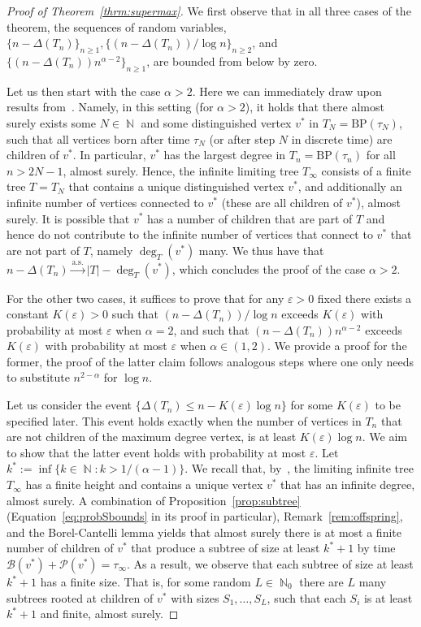 \documentclass[11pt]{article}
\numberwithin{equation}{section}
\DeclareMathOperator{\N}{\mathbb{N}} %
\newcommand{\eps}{\varepsilon} %
\newcommand{\bp}{\mathrm{BP}}
\def\cB{{\mathcal B}}
\def\cP{{\mathcal P}}
\theoremstyle{definition}
\begin{document}
\begin{proof}[Proof of Theorem~\ref{thrm:supermax}]
    We first observe that in all three cases of the theorem, the sequences of random variables, $\{n-\Delta(T_n)\}_{n\geq 1}, \{(n-\Delta(T_n))/\log n\}_{n\geq 2}$, and $\{(n-\Delta(T_n))n^{\alpha-2}\}_{n\geq 1}$, are bounded from below by zero.
    
    Let us then start with the case $\alpha>2$. Here we can immediately draw upon results from~\cite[Theorem $1.2$]{oliveira2005connectivity}. Namely, in this setting (for $\alpha>2$), it holds that there almost surely exists some $N\in\N$ and some distinguished vertex $v^*$ in $T_N=\bp(\tau_N)$, such that all vertices born after time $\tau_N$ (or after step $N$ in discrete time) are children of $v^*$. In particular, $v^*$ has the largest degree in $T_n=\bp(\tau_n)$ for all $n>2N-1$, almost surely. Hence, the infinite limiting tree $T_\infty$ consists of a finite tree $T=T_N$ that contains a unique distinguished vertex $v^*$, and additionally an infinite number of vertices connected to $v^*$ (these are all children of $v^*$), almost surely. It is possible that $v^*$ has a number of children that are part of $T$ and hence do not contribute to the infinite number of vertices that connect to $v^*$ that are not part of $T$, namely $\deg_T(v^*)$ many. We thus have that $n-\Delta(T_n)\overset{\mathrm{a.s.}}{\longrightarrow} |T|-\deg_T(v^*)$, which concludes the proof of the case $\alpha>2$.

    For the other two cases, it suffices to prove that for any $\eps>0$ fixed there exists a constant $K(\eps)>0$ such that $(n-\Delta(T_n))/\log n$  exceeds $K(\eps)$ with probability at most $\eps$ when $\alpha=2$, and such that $(n-\Delta(T_n))n^{\alpha-2}$ exceeds $K(\eps)$ with probability at most $\eps$ when $\alpha\in(1,2)$. We provide a proof for the former, the proof of the latter claim follows analogous steps where one only needs to substitute $n^{2-\alpha}$ for $\log n$.

    Let us consider the event $\{\Delta(T_n)\leq n-K(\eps)\log n\}$ for some $K(\eps)$ to be specified later. This event holds exactly when the number of vertices in $T_n$ that are not children of the maximum degree vertex, is at least $K(\eps)\log n$. We aim to show that the latter event holds with probability at most $\eps$. Let $k^*:=\inf\{k\in\N: k>1/(\alpha-1)\}$. We recall that, by~\cite[Theorem $1.2$]{oliveira2005connectivity}, the limiting infinite tree $T_\infty$ has a finite height and contains a unique vertex $v^*$ that has an infinite degree, almost surely. A combination of Proposition~\ref{prop:subtree} (Equation~\eqref{eq:probSbounds} in its proof in particular), Remark~\ref{rem:offspring}, and the Borel-Cantelli lemma yields that almost surely there is at most a finite number of children of $v^*$ that produce a subtree of size at least $k^*+1$ by time $\cB(v^*)+\cP(v^*)=\tau_\infty$.  As a result, we observe that each subtree of size at least $k^*+1$ has a finite size. That is, for some random $L\in\N_0$ there are $L$ many subtrees rooted at children of $v^*$ with sizes $S_1,\ldots, S_L$, such that each $S_i$ is at least $k^*+1$ and finite, almost surely. 


\end{proof}
\end{document}
